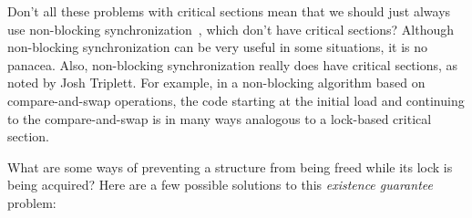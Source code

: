 \begin{enumerate}
\QuickQ{}
	Don't all these problems with critical sections mean that
	we should just always use
	non-blocking synchronization~\cite{MauriceHerlihy90a},
	which don't have critical sections?
\QuickA{}
	Although non-blocking synchronization can be very useful
	in some situations, it is no panacea.
	Also, non-blocking synchronization really does have
	critical sections, as noted by Josh Triplett.
	For example, in a non-blocking algorithm based on
	compare-and-swap operations, the code starting at the
	initial load and continuing to the compare-and-swap
	is in many ways analogous to a lock-based critical section.

\QuickQ{}
	What are some ways of preventing a structure from being freed while
	its lock is being acquired?
\QuickA{}
	Here are a few possible solutions to this \emph{existence guarantee}
	problem:


\end{enumerate}
